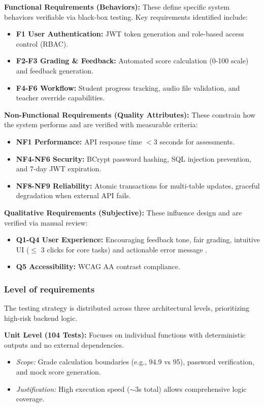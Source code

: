 \documentclass[sigconf]{acmart}
\begin{document}
\textbf{Functional Requirements (Behaviors):}
These define specific system behaviors verifiable via black-box testing. Key requirements identified include:
\begin{itemize}
    \item \textbf{F1 User Authentication:} JWT token generation and role-based access control (RBAC).
    \item \textbf{F2-F3 Grading \& Feedback:} Automated score calculation (0-100 scale) and feedback generation.
    \item \textbf{F4-F6 Workflow:} Student progress tracking, audio file validation, and teacher override capabilities.
\end{itemize}

\textbf{Non-Functional Requirements (Quality Attributes):}
These constrain how the system performs and are verified with measurable criteria:
\begin{itemize}
    \item \textbf{NF1 Performance:} API response time $< 3$ seconds for assessments.
    \item \textbf{NF4-NF6 Security:} BCrypt password hashing, SQL injection prevention, and 7-day JWT expiration.
    \item \textbf{NF8-NF9 Reliability:} Atomic transactions for multi-table updates, graceful degradation when external API fails.
\end{itemize}

\textbf{Qualitative Requirements (Subjective):}
These influence design and are verified via manual review:
\begin{itemize}
    \item \textbf{Q1-Q4 User Experience:} Encouraging feedback tone, fair grading, intuitive UI ($\leq$ 3 clicks for core tasks) and actionable error message
    .
    \item \textbf{Q5 Accessibility:} WCAG AA contrast compliance.
\end{itemize}

\subsubsection{Level of requirements}

The testing strategy is distributed across three architectural levels, prioritizing high-risk backend logic.

\textbf{Unit Level (104 Tests):}
Focuses on individual functions with deterministic outputs and no external dependencies.
\begin{itemize}
    \item \textit{Scope:} Grade calculation boundaries (e.g., 94.9 vs 95), password verification, and mock score generation.
    \item \textit{Justification:} High execution speed ($\sim$3s total) allows comprehensive logic coverage.
\end{itemize}
\end{document}

